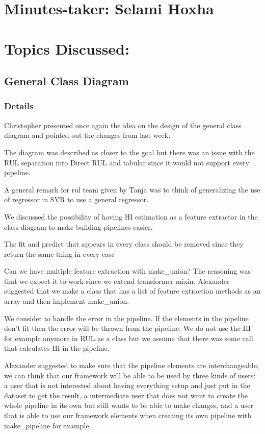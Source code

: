 \documentclass[11pt]{meetingmins} %
\begin{document}
\maketitle

\section{Minutes-taker: Selami Hoxha}

\section{Topics Discussed:}

\subsection{General Class Diagram}
\subsubsection{Details}
\begin{hiddensubitems}
	\item Christopher presented once again the idea on the design of the general class diagram and pointed
	out the changes from last week.
	\item The diagram was described as closer to the goal but there was an issue with the RUL separation
	into Direct RUL and tabular since it would not support every pipeline.
	\item A general remark for rul team given by Tanja was to think of generalizing the use of regressor
	in SVR to use a general regressor.
	\item We discussed the possibility of having HI estimation as a feature extractor in the class diagram
	to make building pipelines easier.
	\item The fit and predict that appears in every class should be removed since they return the same
	thing in every case
	\item Can we have multiple feature extraction with make\_union? The reasoning was that we expect it to
	work since we extend transformer mixin. Alexander suggested that we make a class that has a list of
	feature extraction methods as an array and then implement make\_union.
	\item We consider to handle the error in the pipeline. If the elements in the pipeline don't fit then
	the error will be thrown from the pipeline. We do not use the HI for example anymore in RUL as a class
	but we assume that there was some call that calculates HI in the pipeline.
	\item Alexander suggested to make sure that the pipeline elements are interchangeable, we can think that our framework will be able to be used by three kinds of users: a user that is not interested
	about having everything setup and just put in the dataset to get the result, a intermediate user
	that does not want to create the whole pipeline in its own but still wants to be able to make changes,
	and a user that is able to use our framework elements when creating its own pipeline with
	make\_pipeline for example.
\end{hiddensubitems}
\end{document}
